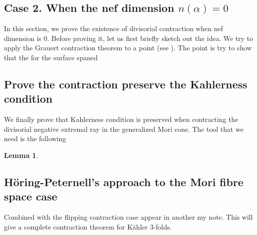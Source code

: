\documentclass[11pt]{article}
\theoremstyle{definition}
\newtheorem{lemma}[theorem]{Lemma}
\begin{document}
	\subsection{Case 2. When the nef dimension $n(\alpha) = 0$}
	
	In this section, we prove the existence of divisorial contraction when nef dimension is 0. Before proving it, let us first briefly sketch out  the idea. We try to apply the Grauert contraction theorem to a point (see \cite[Lemma 4.3]{DH24}). The point is try to show that the for the surface spaned 
	\subsection{Prove the contraction preserve the Kahlerness condition}
	We finally prove that Kahlerness condition is preserved when contracting the divisorial negative extremal ray in the generalized Mori cone. The tool that we need is the following 
	\begin{lemma}
		
	\end{lemma}
	
	\subsection{H\"oring-Peternell's approach to the Mori fibre space case}
	
	
	Combined with the flipping contraction case appear in another my note. This will give a complete contraction theorem for K\"ahler 3-folds.
	
	
	
	
	
\end{document}
